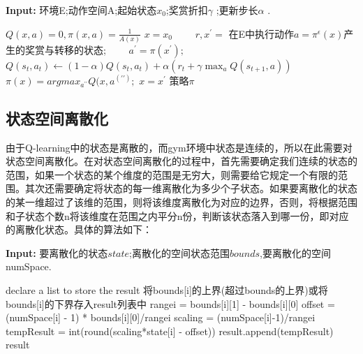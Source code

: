 \documentclass[a4paper,UTF8]{article}
\theoremstyle{definition}
\begin{document}
\begin{algorithm}


\hspace*{0.02in} {\bf Input:} %
环境E;动作空间A;起始状态$x_0$;奖赏折扣$\gamma$ ;更新步长$\alpha$ .
\begin{algorithmic}[1]


\State $Q(x,a)=0, \pi (x,a)=\frac{1}{A(x)}$
$x=x_0$
　　\State $r,x^{\prime}=$ 在E中执行动作$a=\pi^\epsilon(x)$产生的奖赏与转移的状态;
　　\State $a^{\prime}=\pi(x^{\prime});$
    \State $Q(s_t,a_t) \leftarrow (1-\alpha)Q(s_t,a_t)+\alpha(r_t+\gamma \max_aQ(s_{t+1},a))$
    \State $\pi(x)=argmax_{a^{\prime\prime}}Q(x,a^(\prime\prime);$
    \State $x=x^\prime$
\EndFor
\State \Return 策略$\pi$
\end{algorithmic}
\end{algorithm}

\subsection*{状态空间离散化}

由于Q-learning中的状态是离散的，而gym环境中状态是连续的，所以在此需要对状态空间离散化。在对状态空间离散化的过程中，首先需要确定我们连续的状态的范围，如果一个状态的某个维度的范围是无穷大，则需要给它规定一个有限的范围。其次还需要确定将状态的每一维离散化为多少个子状态。如果要离散化的状态的某一维超过了该维的范围，则将该维度离散化为对应的边界，否则，将根据范围和子状态个数n将该维度在范围之内平分n份，判断该状态落入到哪一份，即对应的离散化状态。具体的算法如下：

\begin{algorithm}

\hspace*{0.02in} {\bf Input:}
要离散化的状态$state$;离散化的空间状态范围$bounds$,要离散化的空间numSpace.
\begin{algorithmic}[1]
\State declare a list to store the result
        \State 将bounds[i]的上界(超过bounds的上界)或将bounds[i]的下界存入result列表中
    \Else
        \State rangei = bounds[i][1] - bounds[i][0]
        \State offset = (numSpace[i] - 1) * bounds[i][0]/rangei
        \State scaling = (numSpace[i]-1)/rangei
        \State tempResult = int(round(scaling*state[i] - offset))
        \State result.append(tempResult)
     \EndIf
\State \Return result
\EndFor

\end{algorithmic}
\end{algorithm}
\end{document}
